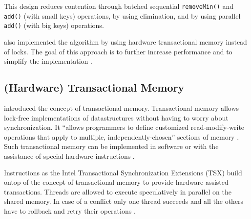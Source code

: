 This design reduces contention through batched sequential \texttt{removeMin()} and \texttt{add()} (with small keys) operations, by using elimination, and by using parallel \texttt{add()} (with big keys) operations. 

\citeauthor{calciu_adaptive_2014} also implemented the algorithm by using hardware transactional memory instead of locks. The goal of this approach is to further increase performance and to simplify the implementation \cite{calciu_adaptive_2014}.

\subsection{(Hardware) Transactional Memory}

\citeauthor{herlihy_transactional_1993} introduced the concept of transactional memory. Transactional memory allows lock-free implementations of datastructures without having to worry about synchronization. It \enquote{allows programmers to define customized read-modify-write operations that apply to multiple, independently-chosen} sections of memory \cite[289]{herlihy_transactional_1993}.
Such transactional memory can be implemented in software or with the assistance of special hardware instructions \cite{herlihy_transactional_1993}.

Instructions as the Intel Transactional Synchronization Extensions (TSX) \cite{intel_corporation_transactional_2012} build ontop of the concept of transactional memory to provide hardware assisted transactions.
Threads are allowed to execute speculatively in parallel on the shared memory. In case of a conflict only one thread succeeds and all the others have to rollback and retry their operations \cite{calciu_adaptive_2014}.